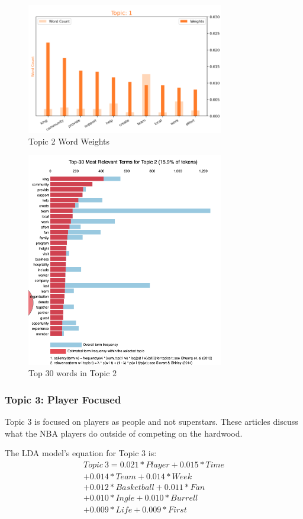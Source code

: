 \documentclass[5p,authoryear]{elsarticle}
\begin{document}
\begin{figure}[!htb] \centering
	\includegraphics[width=3.4in]{figures/Topic1_words.png}
	\caption[]{Topic 2 Word Weights} 
	\label{weights2} 
\end{figure}


\begin{figure}[!htb] \centering
	\includegraphics[width=3.4in]{figures/top_topic2.png}
	\caption[]{Top 30 words in Topic 2} 
	\label{words2} 
\end{figure}



\subsubsection{Topic 3: Player Focused}

Topic 3 is focused on players as people and not superstars. 
These articles discuss what the NBA players do outside of competing on the hardwood.

The LDA model's equation for Topic 3 is:
\begin{align*}
    Topic\ 3 = 0.021*Player + 0.015*Time \\
    + 0.014*Team + 0.014*Week \\
    + 0.012*Basketball + 0.011*Fan \\
    + 0.010*Ingle + 0.010*Burrell \\
    + 0.009*Life + 0.009*First
    \label{eq:3}
\end{align*}
\end{document}
